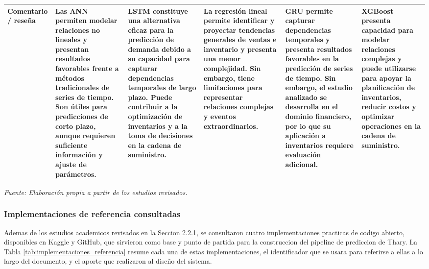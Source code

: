 \begin{table}[H]
{\begin{tabular}{|p{2.5cm}|p{4.5cm}|p{4.5cm}|p{4.5cm}|p{4.5cm}|p{4.5cm}|}
\textbf{Comentario / reseña} &
Las ANN permiten modelar relaciones no lineales y presentan resultados favorables frente a métodos tradicionales de series de tiempo. Son útiles para predicciones de corto plazo, aunque requieren suficiente información y ajuste de parámetros. &
LSTM constituye una alternativa eficaz para la predicción de demanda debido a su capacidad para capturar dependencias temporales de largo plazo. Puede contribuir a la optimización de inventarios y a la toma de decisiones en la cadena de suministro. &
La regresión lineal permite identificar y proyectar tendencias generales de ventas e inventario y presenta una menor complejidad. Sin embargo, tiene limitaciones para representar relaciones complejas y eventos extraordinarios. &
GRU permite capturar dependencias temporales y presenta resultados favorables en la predicción de series de tiempo. Sin embargo, el estudio analizado se desarrolla en el dominio financiero, por lo que su aplicación a inventarios requiere evaluación adicional. &
XGBoost presenta capacidad para modelar relaciones complejas y puede utilizarse para apoyar la planificación de inventarios, reducir costos y optimizar operaciones en la cadena de suministro. \\ 
\hline

\end{tabular}%
}

\vspace{0.2cm}

\begin{flushleft}
\footnotesize
\textit{Fuente: Elaboración propia a partir de los estudios revisados.}
\end{flushleft}

\end{table}

\subsubsection{Implementaciones de referencia consultadas}

Ademas de los estudios academicos revisados en la Seccion 2.2.1, se consultaron cuatro implementaciones practicas de codigo abierto, disponibles en Kaggle y GitHub, que sirvieron como base y punto de partida para la construccion del pipeline de prediccion de Thary. La Tabla \ref{tab:implementaciones_referencia} resume cada una de estas implementaciones, el identificador que se usara para referirse a ellas a lo largo del documento, y el aporte que realizaron al diseño del sistema.

